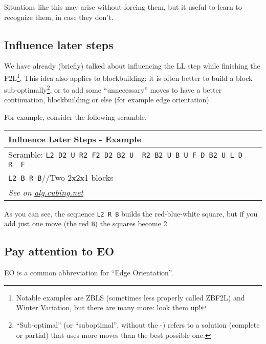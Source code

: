 \documentclass[11pt,a4paper]{book}
\newcommand{\p}{\textquotesingle}
\newcommand{\m}{\texttt}
\newcommand{\ps}{\p\,\,}
\newcommand{\comment}[1]{{\color{gray}\quad//#1}}
\begin{document}
Situations like this may arise without forcing them, but it useful to learn to recognize them, in case they don't.

\subsection{Influence later steps}

We have already (briefly) talked about influencing the LL step while finishing the F2L\footnote{Notable examples are ZBLS (sometimes less properly called ZBF2L) and Winter Variation, but there are many more: look them up!}. This idea also applies to blockbuilding: it is often better to build a block sub-optimally\footnote{``Sub-optimal'' (or ``suboptimal'', without the -) refers to a solution (complete or partial) that uses more moves than the best possible one.}, or to add some ``unnecessary'' moves to have a better continuation, blockbuilding or else (for example edge orientation).

For example, consider the following scramble.

\bigskip
\begin{tabular}{|p{}|}
\hline
\textbf{Influence Later Steps - Example}\\
\hline
Scramble: \m{L2 D2 U R2 F2 D2 B2 U\ps R2 B2 U B U F D B2 U L D\ps R\ps F}\\
\hline
\begin{minipage}[l]{0.650\textwidth}
\m{L2 {\color{red}B} R B}\comment{Two 2x2x1 blocks}
\end{minipage}
\begin{minipage}[c]{0.25\textwidth}

\end{minipage}\\
\hline
\emph{See on }\href{https://alg.cubing.net/?setup=L2_D2_U_R2_F2_D2_B2_U-_R2_B2_U_B_U_F_D_B2_U_L_D-_R-_F&alg=L2_B_R_B_\%2F\%2FTwo_2x2x1_blocks}{\emph{alg.cubing.net}}\\
\hline
\end{tabular}
\bigskip

As you can see, the sequence \m{L2 R B} builds the red-blue-white square, but if you add just one move (the red \m{B}) the squares become 2.

\subsection{Pay attention to EO}
\label{EO_attention}

EO is a common abbreviation for ``Edge Orientation''.
\end{document}
